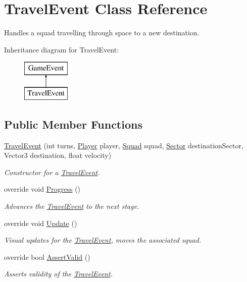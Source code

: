 \hypertarget{class_travel_event}{}\section{Travel\+Event Class Reference}
\label{class_travel_event}


Handles a squad travelling through space to a new destination.  


Inheritance diagram for Travel\+Event\+:\begin{figure}[H]
\begin{center}
\leavevmode
\includegraphics[height=2.000000cm]{class_travel_event}
\end{center}
\end{figure}
\subsection*{Public Member Functions}
\begin{DoxyCompactItemize}
\item 
\hyperlink{class_travel_event_aeccea75747f8b2af9901508727e9c826}{Travel\+Event} (int turns, \hyperlink{class_player}{Player} player, \hyperlink{class_squad}{Squad} squad, \hyperlink{class_sector}{Sector} destination\+Sector, Vector3 destination, float velocity)
\begin{DoxyCompactList}\small\item\em Constructor for a \hyperlink{class_travel_event}{Travel\+Event}. \end{DoxyCompactList}\item 
override void \hyperlink{class_travel_event_a0e6687db5718ae7342cdae88013f604c}{Progress} ()
\begin{DoxyCompactList}\small\item\em Advances the \hyperlink{class_travel_event}{Travel\+Event} to the next stage. \end{DoxyCompactList}\item 
override void \hyperlink{class_travel_event_ac82ebd0d8c07b4d4de101832aa4daab4}{Update} ()
\begin{DoxyCompactList}\small\item\em Visual updates for the \hyperlink{class_travel_event}{Travel\+Event}, moves the associated squad. \end{DoxyCompactList}\item 
override bool \hyperlink{class_travel_event_ab0c6c17356f85b9628da7bfe06914f16}{Assert\+Valid} ()
\begin{DoxyCompactList}\small\item\em Asserts validity of the \hyperlink{class_travel_event}{Travel\+Event}. \end{DoxyCompactList}\end{DoxyCompactItemize}
